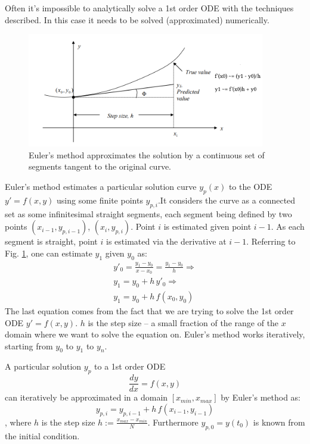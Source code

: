 \documentclass[a4paper]{article}
\begin{document}
Often it's impossible to analytically solve a 1st order ODE with the techniques described. In this case it needs to be solved (approximated) numerically.
\begin{figure}[H]
    \centering
    \includegraphics[height=5cm]{img/euler/eulers_method_sketch.png}
    \caption{Euler's method approximates the solution by a continuous set of segments tangent to the original curve.}
    \label{fig:eulers_method_idea}
\end{figure}

Euler's method estimates a particular solution curve $y_p(x)$ to the ODE $y'=f(x,y)$ using some finite points $y_{p,i}$.It considers the curve as a connected set as some infinitesimal straight segments, each segment being defined by two points $(x_{i-1}, y_{p,i-1})$, $(x_{i}, y_{p,i})$. Point $i$ is estimated given point $i-1$. As each segment is straight, point $i$ is estimated via the derivative at $i-1$. Referring to Fig. \ref{fig:eulers_method_idea}, one can estimate $y_1$ given $y_0$ as:
\begin{gather*}
    y'_{0} = \frac{y_1-y_0}{x-x_0} = \frac{y_1-y_0}{h} \Rightarrow \\
    y_1  = y_{0} + h\, y'_0 \Rightarrow \\
    y_1 = y_0 + h\, f(x_0,y_0)
\end{gather*}
The last equation comes from the fact that we are trying to solve the 1st order ODE  $y'=f(x,y)$. $h$ is the step size -- a small fraction of the range of the $x$ domain where we want to solve the equation on.  Euler's method works iteratively, starting from $y_0$ to $y_1$ to $y_n$.
\begin{corollary}
A particular solution $y_p$ to a 1st order ODE
\[
\frac{dy}{dx} = f(x,y)
\]
can iteratively be approximated in a domain $[x_{min}, x_{max}]$ by Euler's method as:
\begin{equation}
        y_{p,i} = y_{p,i-1} + h\, f(x_{i-1},y_{i-1})
\end{equation}
, where $h$ is the step size $h:=\tfrac{x_{max} - x_{min}}{N}$. Furthermore $y_{p,0} = y(t_0)$ is known from the initial condition.
\end{corollary}
\end{document}
